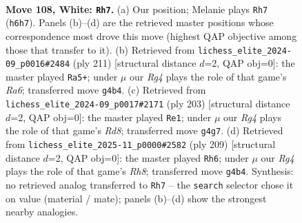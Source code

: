 \documentclass[11pt]{article}
\begin{document}
\clearpage

\begin{figure}[p]\centering
\begin{subfigure}{0.46\textwidth}\centering
\resizebox{\linewidth}{!}{%
\newchessgame
\chessboard[
  setfen={4k3/8/7R/8/6R1/8/5K2/8 w - - 9 108},
  showmover=false,
  pgfstyle=straightmove, color=movearrow, markmove={h6-h7}
]}
\caption{}
\end{subfigure}\hfill
\begin{subfigure}{0.46\textwidth}\centering
\resizebox{\linewidth}{!}{%
\newchessgame
\chessboard[
  setfen={8/8/8/4K3/8/r7/8/3k4 b - - 1 106},
  showmover=false,
  pgfstyle=straightmove, color=movearrow, markmove={a3-a5}
]}
\caption{}
\end{subfigure}
\\[4pt]
\begin{subfigure}{0.46\textwidth}\centering
\resizebox{\linewidth}{!}{%
\newchessgame
\chessboard[
  setfen={8/8/5K2/8/8/5k2/8/3r4 b - - 5 102},
  showmover=false,
  pgfstyle=straightmove, color=movearrow, markmove={d1-e1}
]}
\caption{}
\end{subfigure}\hfill
\begin{subfigure}{0.46\textwidth}\centering
\resizebox{\linewidth}{!}{%
\newchessgame
\chessboard[
  setfen={8/3K4/8/8/8/5k2/8/7r b - - 1 105},
  showmover=false,
  pgfstyle=straightmove, color=movearrow, markmove={h1-h6}
]}
\caption{}
\end{subfigure}
\caption{\textbf{Move 108, White: \texttt{Rh7}.} (a) Our position; Melanie plays \texttt{Rh7} (\texttt{h6h7}). Panels (b)--(d) are the retrieved master positions whose correspondence most drove this move (highest QAP objective among those that transfer to it). (b) Retrieved from \texttt{lichess\_elite\_2024-09\_p0016\#2484} (ply 211) [structural distance $d$=2, QAP obj=0]: the master played \texttt{Ra5+}; under $\mu$ our \emph{Rg4} plays the role of that game's \emph{Ra6}; transferred move \texttt{g4b4}. (c) Retrieved from \texttt{lichess\_elite\_2024-09\_p0017\#2171} (ply 203) [structural distance $d$=2, QAP obj=0]: the master played \texttt{Re1}; under $\mu$ our \emph{Rg4} plays the role of that game's \emph{Rd8}; transferred move \texttt{g4g7}. (d) Retrieved from \texttt{lichess\_elite\_2025-11\_p0000\#2582} (ply 209) [structural distance $d$=2, QAP obj=0]: the master played \texttt{Rh6}; under $\mu$ our \emph{Rg4} plays the role of that game's \emph{Rh8}; transferred move \texttt{g4b4}. Synthesis: no retrieved analog transferred to \texttt{Rh7} -- the \texttt{search} selector chose it on value (material / mate); panels (b)--(d) show the strongest nearby analogies.}
\label{fig:thought-m214}
\end{figure}
\end{document}
